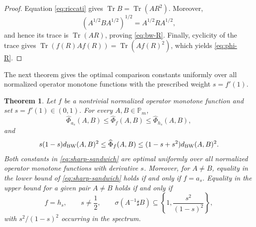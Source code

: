 \documentclass[11pt]{amsart}
\newtheorem{theorem}{Theorem}[section]
\theoremstyle{definition}
\theoremstyle{remark}
\newcommand{\Pm}{\mathbb P_m}
\newcommand{\Tr}{\operatorname{Tr}}
\newcommand{\altPhi}{\widehat{\Phi}}
\begin{document}
	\begin{proof}
		Equation \eqref{eq:riccati} gives
		$\Tr B=\Tr(AR^2)$.  Moreover,
		\[
		(A^{1/2}BA^{1/2})^{1/2}=A^{1/2}RA^{1/2},
		\]
		and hence its trace is $\Tr(AR)$, proving \eqref{eq:bw-R}.  Finally,
		cyclicity of the trace gives
		$\Tr(f(R)Af(R))=\Tr(Af(R)^2)$, which yields
		\eqref{eq:phi-R}.
	\end{proof}
	
The next theorem gives the optimal comparison constants uniformly over all
normalized operator monotone functions with the prescribed weight
$s=f'(1)$.

\begin{theorem}
		\label{thm:sharp-comparison}
		Let $f$ be a nontrivial normalized operator monotone function and set
		$s=f'(1)\in(0,1)$.  For every $A,B\in\Pm$,
		\begin{equation}\label{eq:endpoint-comparison}
			\altPhi_{a_s}(A,B)
			\le\altPhi_f(A,B)
			\le\altPhi_{h_s}(A,B),
		\end{equation}
		and
		\begin{equation}\label{eq:sharp-sandwich}
			s(1-s)d_{\rm BW}(A,B)^2
			\le\altPhi_f(A,B)
			\le(1-s+s^2)d_{\rm BW}(A,B)^2.
		\end{equation}
		Both constants in \eqref{eq:sharp-sandwich} are optimal uniformly over all
		normalized operator monotone functions with derivative $s$.
		Moreover, for $A\ne B$, equality in the lower bound of
		\eqref{eq:sharp-sandwich} holds if and only if $f=a_s$.  Equality in the
		upper bound for a given pair $A\ne B$ holds if and only if
		\[
		f=h_s,\qquad s\ne\frac12,
		\qquad
		\sigma(A^{-1}\sharp B)
		\subseteq\left\{1,\frac{s^2}{(1-s)^2}\right\},
		\]
		with $s^2/(1-s)^2$ occurring in the spectrum.
	\end{theorem}
	
\end{document}
